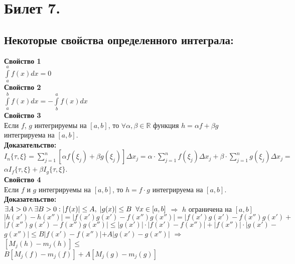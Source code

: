 \documentclass[a4paper,12pt]{article} %
\begin{document}

\newpage

\section*{Билет 7.}

\subsection*{Некоторые свойства определенного интеграла:}

\begin{enumerate}
    \textbf{Свойство 1}\\[5mm] $\int \limits_a^a f(x)dx = 0$\\[2mm]
    \textbf{Свойство 2}\\[5mm] $\int \limits_a^b f(x)dx = -\int \limits_b^a f(x)dx$\\[2mm]
    \textbf{Свойство 3}\\[5mm] Если $ f $, $ g $ интегрируемы на $ [a, b] $, то $\forall{\alpha, \beta} \in \mathbb{R} $ функция $ h = \alpha f + \beta g $ интегрируема на $ [a, b] $. \\ [5 mm]
    \textbf{Доказательство:} \\[5 mm]
    $ I_n \{ \tau, \xi \} = \sum\limits_{j = 1}^n   [\alpha f(\xi_j) + \beta g(\xi_j)] \Delta x_j  =  \alpha \cdot \sum\limits_{j = 1}^n f(\xi_j)\Delta x_j + \beta \cdot \sum\limits_{j = 1}^n g(\xi_j)\Delta x_j = $ \\ [2 mm] $ \alpha I_f \{\tau, \xi \} + \beta I_g \{\tau, \xi \} $.   \\ [2 mm] 
    \textbf{Свойство 4}\\[5mm] Если $ f $ и $ g $ интегрируемы на $ [a, b] $, то $ h = f \cdot g $ интегрируема на $ [a, b] $. \\ [2mm]
    \textbf{Доказательство:} \\[3 mm]
    $ \exists A > 0 \wedge  \exists B > 0: |f(x)| \leq A, \hspace*{1mm} |g(x)| \leq B \hspace*{2mm} \forall x \in [a, b]$ $\Rightarrow$ $ h $ ограничена на $ [a, b]$ \\ [2 mm]
    $| h(x') - h(x'') | = | f(x')g(x') - f(x'')g(x'')| = |f(x')g(x') - f(x'')g(x') + $ \\ [2 mm] $|f(x'')g(x') - f(x'')g(x'') | \leq |g(x')| \cdot |f(x') - f(x'')| + |f(x'')| \cdot | g(x') - $ \\ [2 mm] $ g(x'') | \leq B|f(x') - f(x'')| + A|g(x') - g(x'')| $ $\Rightarrow$  $[ M_j(h) - m_j(h)] \leq $ \\ [2mm] $  B[M_j(f) - m_j(f)] + A[M_j(g) - m_j(g)] $ \\ [3 mm]

\end{enumerate}
\end{document}
